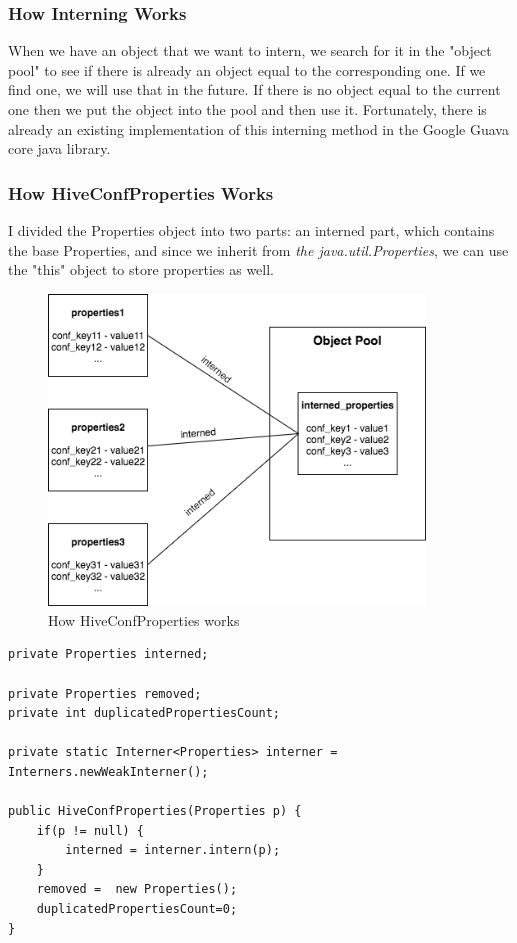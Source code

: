 \subsubsection{How Interning Works} 
When we have an object that we want to intern, we search for it in the "object pool" to see if there is already an object equal to the corresponding one. If we find one, we will use that in the future. If there is no object equal to the current one then we put the object into the pool and then use it. Fortunately, there is already an existing implementation of this interning method in the Google Guava core java library.
 
  \subsubsection{How HiveConfProperties Works}
 I divided the Properties object into two parts: an interned part, which contains the base Properties, and since we inherit from \textit{the java.util.Properties}, we can use the "this" object to store properties as well.
 
 \begin{figure}[H]
 	\includegraphics[width=100mm,keepaspectratio]{figures/hiveconf_solution.png}
 	\centering
 	\caption{How HiveConfProperties works}
 \end{figure}

\begin{lstlisting}
private Properties interned;

private Properties removed;
private int duplicatedPropertiesCount;

private static Interner<Properties> interner = Interners.newWeakInterner();

public HiveConfProperties(Properties p) {
	if(p != null) {
		interned = interner.intern(p);
	}
	removed =  new Properties();
	duplicatedPropertiesCount=0;
}
\end{lstlisting}

